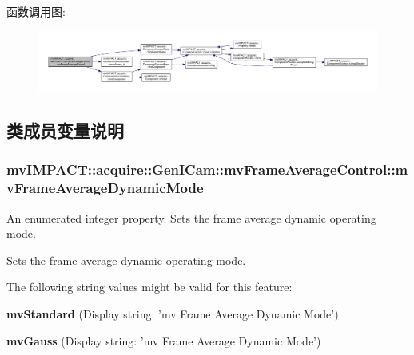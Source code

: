 函数调用图\+:
\nopagebreak
\begin{figure}[H]
\begin{center}
\leavevmode
\includegraphics[width=350pt]{classmv_i_m_p_a_c_t_1_1acquire_1_1_gen_i_cam_1_1mv_frame_average_control_a00ee9c866bcbeca61561b7fe26f9c9db_cgraph}
\end{center}
\end{figure}




\subsection{类成员变量说明}
\hypertarget{classmv_i_m_p_a_c_t_1_1acquire_1_1_gen_i_cam_1_1mv_frame_average_control_a1b2eefa6cd21b59884cfc889c95cbd94}{
\subsubsection[{mv\+Frame\+Average\+Dynamic\+Mode}]{ mv\+I\+M\+P\+A\+C\+T\+::acquire\+::\+Gen\+I\+Cam\+::mv\+Frame\+Average\+Control\+::mv\+Frame\+Average\+Dynamic\+Mode}}\label{classmv_i_m_p_a_c_t_1_1acquire_1_1_gen_i_cam_1_1mv_frame_average_control_a1b2eefa6cd21b59884cfc889c95cbd94}


An enumerated integer property. Sets the frame average dynamic operating mode. 

Sets the frame average dynamic operating mode.

The following string values might be valid for this feature\+:
\begin{DoxyItemize}
\item {\bfseries mv\+Standard} (Display string\+: 'mv Frame Average Dynamic Mode')
\item {\bfseries mv\+Gauss} (Display string\+: 'mv Frame Average Dynamic Mode')
\end{DoxyItemize}

